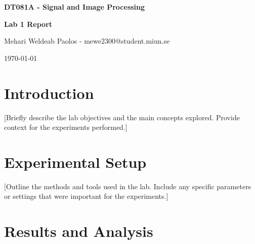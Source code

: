 \documentclass[11pt,a4paper]{article}
\begin{document}
\begin{center}

{\Large \textbf{DT081A - Signal and Image Processing}}

\vspace{0.4cm}

{\large \textbf{Lab 1 Report}}

\vspace{0.4cm}

Mehari Weldeab Paolos - mewe2300@student.miun.se

\vspace{0.2cm}

\today

\end{center}

\vspace{0.5cm}

\section{Introduction}

[Briefly describe the lab objectives and the main concepts explored.
Provide context for the experiments performed.]

\section{Experimental Setup}

[Outline the methods and tools used in the lab.
Include any specific parameters or settings that were important
for the experiments.]

\section{Results and Analysis}
\end{document}
